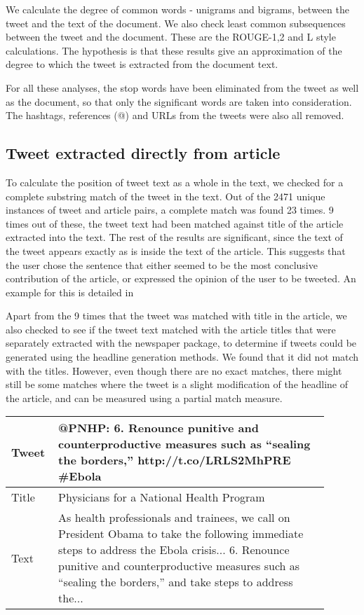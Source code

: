 We calculate the degree of common words - unigrams and bigrams, between the tweet and the text of the document. We also check least common subsequences between the tweet and the document. These are the ROUGE-1,2 and L style calculations. The hypothesis is that these results give an approximation of the degree to which the tweet is extracted from the document text. 

For all these analyses, the stop words have been eliminated from the tweet as well as the document, so that only the significant words are taken into consideration. The hashtags, references (@) and URLs from the tweets were also all removed.

\subsection {Tweet extracted directly from article}
To calculate the position of tweet text as a whole in the text, we checked for a complete substring match of the tweet in the text. Out of the 2471 unique instances of tweet and article pairs, a complete match was found 23 times. 9 times out of these, the tweet text had been matched against title of the article extracted into the text. The rest of the results are significant, since the text of the tweet appears exactly as is inside the text of the article. This suggests that the user chose the sentence that either seemed to be the most conclusive contribution of the article, or expressed the opinion of the user to be tweeted. An example for this is detailed in 

Apart from the 9 times that the tweet was matched with title in the article, we also checked to see if the tweet text matched with the article titles that were separately extracted with the newspaper package, to determine if tweets could be generated using the headline generation methods. We found that it did not match with the titles. However, even though there are no exact matches, there might still be some matches where the tweet is a slight modification of the headline of the article, and can be measured using a partial match measure. 

\begin{table}[htbp]
\centering
\begin{tabular}{|p{0.1\linewidth}|p{0.8\linewidth}|}
\hline
Tweet &  @PNHP: 6. Renounce punitive and counterproductive measures such as “sealing the borders,” http://t.co/LRLS2MhPRE \#Ebola \\ \hline
Title & Physicians for a National Health Program \\  \hline
Text  & As health professionals and trainees, we call on President Obama to take the following immediate steps to address the Ebola crisis... 6. Renounce punitive and counterproductive measures such as “sealing the borders,” and take steps to address the... \\ \hline
\end{tabular}
\label{tab:fullextract}
\end{table}

